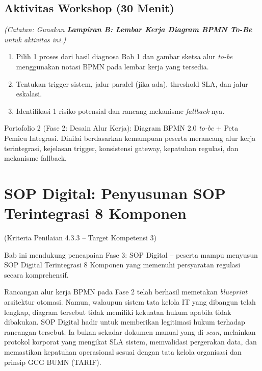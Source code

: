 \documentclass[12pt,a4paper]{report}
\begin{document}

\section{Aktivitas Workshop (30 Menit)}
\textit{(Catatan: Gunakan \textbf{Lampiran B: Lembar Kerja Diagram BPMN To-Be} untuk aktivitas ini.)}
\begin{enumerate}[leftmargin=*]
    \item Pilih 1 proses dari hasil diagnosa Bab 1 dan gambar sketsa alur \textit{to-be} menggunakan notasi BPMN pada lembar kerja yang tersedia.
    \item Tentukan trigger sistem, jalur paralel (jika ada), threshold SLA, dan jalur eskalasi.
    \item Identifikasi 1 risiko potensial dan rancang mekanisme \textit{fallback}-nya.
\end{enumerate}

\begin{outputbox}
Portofolio 2 (Fase 2: Desain Alur Kerja): Diagram BPMN 2.0 \textit{to-be} + Peta Pemicu Integrasi. Dinilai berdasarkan kemampuan peserta merancang alur kerja terintegrasi, kejelasan trigger, konsistensi gateway, kepatuhan regulasi, dan mekanisme fallback.
\end{outputbox}


\chapter{SOP Digital: Penyusunan SOP Terintegrasi 8 Komponen}
(Kriteria Penilaian 4.3.3 -- Target Kompetensi 3)

Bab ini mendukung pencapaian Fase 3: SOP Digital -- peserta mampu menyusun SOP Digital Terintegrasi 8 Komponen yang memenuhi persyaratan regulasi secara komprehensif. 

Rancangan alur kerja BPMN pada Fase 2 telah berhasil memetakan \textit{blueprint} arsitektur otomasi. Namun, walaupun sistem tata kelola IT yang dibangun telah lengkap, diagram tersebut tidak memiliki kekuatan hukum apabila tidak dibakukan. SOP Digital hadir untuk memberikan legitimasi hukum terhadap rancangan tersebut. Ia bukan sekadar dokumen manual yang di-\textit{scan}, melainkan protokol korporat yang mengikat SLA sistem, memvalidasi pergerakan data, dan memastikan kepatuhan operasional sesuai dengan tata kelola organisasi dan prinsip GCG BUMN (TARIF).
\end{document}
